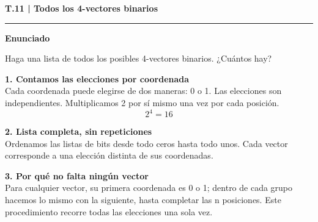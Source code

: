 \documentclass[11pt,a4paper,landscape]{article}
\newcommand{\titulo}[1]{{\LARGE\bfseries #1}\par\smallskip\hrule\medskip}
\begin{document}
\normalsize
\newpage{}\hypertarget{1.2-T.11}{}
\titulo{T.11 | Todos los 4-vectores binarios}
\textbf{Enunciado}\par Haga una lista de todos los posibles 4-vectores binarios. ¿Cuántos hay?
\par\medskip\large
\noindent\begin{minipage}{\linewidth}\textbf{1. Contamos las elecciones por coordenada}\\[2pt]Cada coordenada puede elegirse de dos maneras: 0 o 1. Las elecciones son independientes. Multiplicamos 2 por sí mismo una vez por cada posición.
\[2^{4}=16\]
\end{minipage}\par\medskip
\noindent\begin{minipage}{\linewidth}\textbf{2. Lista completa, sin repeticiones}\\[2pt]Ordenamos las listas de bits desde todo ceros hasta todo unos. Cada vector corresponde a una elección distinta de sus coordenadas.
\par{}\par\smallskip
\end{minipage}\par\medskip
\noindent\begin{minipage}{\linewidth}\textbf{3. Por qué no falta ningún vector}\\[2pt]Para cualquier vector, su primera coordenada es 0 o 1; dentro de cada grupo hacemos lo mismo con la siguiente, hasta completar las n posiciones. Este procedimiento recorre todas las elecciones una sola vez.
\end{minipage}\par\medskip
\end{document}
